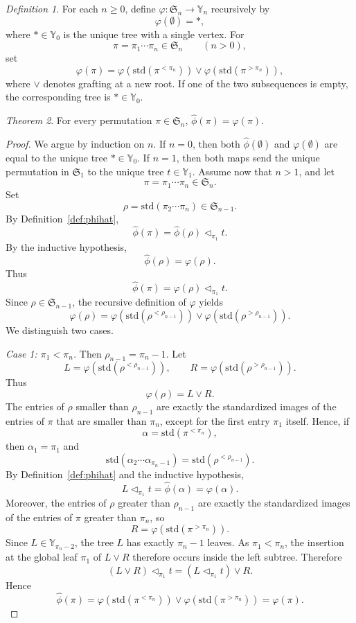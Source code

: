 \documentclass[a4paper]{article}
\theoremstyle{plain}
\theoremstyle{definition}
\theoremstyle{remark}
\numberwithin{equation}{section}
\newcommand{\Sym}{\mathfrak{S}}
\newcommand{\Y}{\mathbb{Y}}
\newcommand{\std}{\mathrm{std}}
\newtheorem{theorem}{Theorem}[section]
\newtheorem{definition}[theorem]{Definition}
\begin{document}
\begin{definition}\label{def:varphi}
For each \(n\ge 0\), define \(\varphi:\Sym_n\to\Y_n\) recursively by
\[
\varphi(\emptyset)=\ast,
\]
where \(\ast\in\Y_0\) is the unique tree with a single vertex. For
\[
\pi=\pi_1\cdots\pi_n\in\Sym_n
\qquad (n>0),
\]
set
\[
\varphi(\pi)=
\varphi(\std(\pi^{<\pi_n}))\vee
\varphi(\std(\pi^{>\pi_n})),
\]
where \(\vee\) denotes grafting at a new root. If one of the two subsequences is
empty, the corresponding tree is \(\ast\in\Y_0\).
\end{definition}

\begin{theorem}\label{thm:phihat-equals-varphi}
For every permutation \(\pi\in\Sym_n\), $\widehat\phi(\pi)=\varphi(\pi)$.
\end{theorem}
\begin{proof}
We argue by induction on \(n\). If \(n=0\), then both \(\widehat\phi(\emptyset)\) and \(\varphi(\emptyset)\) are
equal to the unique tree \(\ast\in\Y_0\). If \(n=1\), then both maps send the
unique permutation in \(\Sym_1\) to the unique tree \(t\in\Y_1\). Assume now that \(n>1\), and let
\[
\pi=\pi_1\cdots \pi_n\in\Sym_n.
\]
Set
\[
\rho=\std(\pi_2\cdots \pi_n)\in\Sym_{n-1}.
\]
By Definition~\ref{def:phihat},
\[
\widehat\phi(\pi)=\widehat\phi(\rho)\triangleleft_{\pi_1} t.
\]
By the inductive hypothesis,
\[
\widehat\phi(\rho)=\varphi(\rho).
\]
Thus
\[
\widehat\phi(\pi)=\varphi(\rho)\triangleleft_{\pi_1} t.
\]
Since \(\rho\in\Sym_{n-1}\), the recursive definition of \(\varphi\) yields
\[
\varphi(\rho)
=
\varphi(\std(\rho^{<\rho_{n-1}}))\vee
\varphi(\std(\rho^{>\rho_{n-1}})).
\]
We distinguish two cases.

\medskip
\noindent\emph{Case 1: \(\pi_1<\pi_n\).}
Then \(\rho_{n-1}=\pi_n-1\). Let
\[
L=\varphi(\std(\rho^{<\rho_{n-1}})),
\qquad
R=\varphi(\std(\rho^{>\rho_{n-1}})).
\]
Thus
\[
\varphi(\rho)=L\vee R.
\]
The entries of \(\rho\) smaller than \(\rho_{n-1}\) are exactly the standardized
images of the entries of \(\pi\) that are smaller than \(\pi_n\), except for the
first entry \(\pi_1\) itself. Hence, if
\[
\alpha=\std(\pi^{<\pi_n}),
\]
then \(\alpha_1=\pi_1\) and
\[
\std(\alpha_2\cdots\alpha_{\pi_n-1})=\std(\rho^{<\rho_{n-1}}).
\]
By Definition~\ref{def:phihat} and the inductive hypothesis,
\[
L\triangleleft_{\pi_1} t
=
\widehat\phi(\alpha)
=
\varphi(\alpha).
\]
Moreover, the entries of \(\rho\) greater than \(\rho_{n-1}\) are exactly the
standardized images of the entries of \(\pi\) greater than \(\pi_n\), so
\[
R=\varphi(\std(\pi^{>\pi_n})).
\]
Since \(L\in\Y_{\pi_n-2}\), the tree \(L\) has exactly \(\pi_n-1\) leaves.
As \(\pi_1<\pi_n\), the insertion at the global leaf \(\pi_1\) of \(L\vee R\)
therefore occurs inside the left subtree. Therefore
\[
(L\vee R)\triangleleft_{\pi_1} t
=
(L\triangleleft_{\pi_1} t)\vee R.
\]
Hence
\[
\widehat\phi(\pi)
=
\varphi(\std(\pi^{<\pi_n}))\vee \varphi(\std(\pi^{>\pi_n}))
=
\varphi(\pi).
\]


\end{proof}
\end{document}
